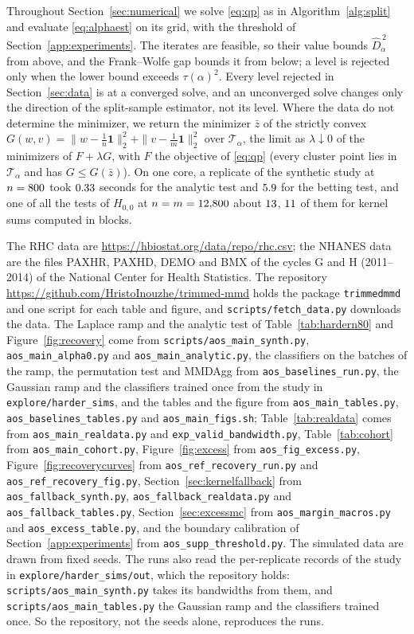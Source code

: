 Throughout Section~\ref{sec:numerical} we solve \eqref{eq:qp} as in Algorithm~\ref{alg:split} and evaluate
\eqref{eq:alphaest} on its grid, with the threshold of Section~\ref{app:experiments}. The iterates are feasible, so
their value bounds $\widehat D_\alpha^{\,2}$ from above, and the Frank--Wolfe gap bounds it from below; a level is
rejected only when the lower bound exceeds $\tau(\alpha)^2$. Every level rejected in Section~\ref{sec:data} is at a converged solve, and an
unconverged solve changes only the direction of the split-sample estimator, not its level. Where
the data do not determine the minimizer, we return the minimizer $\bar z$ of the strictly convex
$G(w,v)=\|w-\tfrac1n\mathbf 1\|_2^2+\|v-\tfrac1m\mathbf 1\|_2^2$ over $\mathcal T_\alpha$, the limit as
$\lambda\downarrow0$ of the minimizers of $F+\lambda G$, with $F$ the objective of \eqref{eq:qp} (every cluster point
lies in $\mathcal T_\alpha$ and has $G\le G(\bar z)$). On one core, a replicate of the synthetic study at
$n=800$ took $0.33$ seconds for the analytic test and $5.9$ for the betting
test, and one of all the tests of $H_{0,0}$ at $n=m=12{,}800$ about $13$, $11$ of
them for kernel sums computed in blocks.

The RHC data are \url{https://hbiostat.org/data/repo/rhc.csv}; the NHANES data are the files PAXHR, PAXHD, DEMO and BMX
of the cycles G and H (2011--2014) of the National Center for Health Statistics. The repository
\url{https://github.com/HristoInouzhe/trimmed-mmd} holds the package \texttt{trimmedmmd} and one script for each table
and figure, and \texttt{scripts/fetch\_data.py} downloads the data. The Laplace ramp and the analytic test of
Table~\ref{tab:hardern80} and Figure~\ref{fig:recovery} come from \texttt{scripts/aos\_main\_synth.py},
\texttt{aos\_main\_alpha0.py} and \texttt{aos\_main\_analytic.py}, the classifiers on the batches of the ramp, the
permutation test and MMDAgg from \texttt{aos\_baselines\_run.py}, the Gaussian ramp and the classifiers trained once
from the study in \texttt{explore/harder\_sims}, and the tables and the figure from \texttt{aos\_main\_tables.py},
\texttt{aos\_baselines\_tables.py} and \texttt{aos\_main\_figs.sh}; Table~\ref{tab:realdata} comes from
\texttt{aos\_main\_realdata.py} and \texttt{exp\_valid\_bandwidth.py}, Table~\ref{tab:cohort} from
\texttt{aos\_main\_cohort.py}, Figure~\ref{fig:excess} from \texttt{aos\_fig\_excess.py},
Figure~\ref{fig:recoverycurves} from \texttt{aos\_ref\_recovery\_run.py} and \texttt{aos\_ref\_recovery\_fig.py},
Section~\ref{sec:kernelfallback} from \texttt{aos\_fallback\_synth.py}, \texttt{aos\_fallback\_realdata.py} and
\texttt{aos\_fallback\_tables.py}, Section~\ref{sec:excessmc} from \texttt{aos\_margin\_macros.py} and \texttt{aos\_excess\_table.py}, and the boundary
calibration of Section~\ref{app:experiments} from \texttt{aos\_supp\_threshold.py}. The simulated data are drawn from
fixed seeds. The runs also read the per-replicate records of the study in \texttt{explore/harder\_sims/out}, which the
repository holds: \texttt{scripts/aos\_main\_synth.py} takes its bandwidths from them, and
\texttt{scripts/aos\_main\_tables.py} the Gaussian ramp and the classifiers trained once. So the repository, not the
seeds alone, reproduces the runs.

